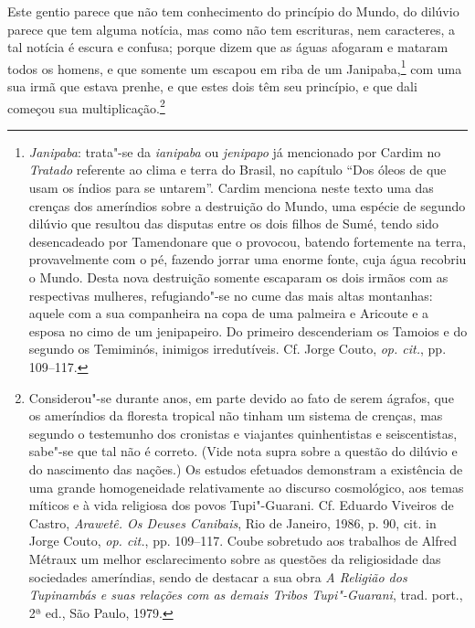 Este gentio parece que não tem conhecimento do
princípio do Mundo, do dilúvio parece que tem alguma notícia, mas como
não tem escrituras, nem caracteres, a tal notícia é escura e confusa;
porque dizem que as águas afogaram e mataram todos os homens, e que
somente um escapou em riba de um Janipaba,\footnote{ \textit{Janipaba}: 
trata"-se da \textit{ianipaba} ou \textit{jenipapo} já mencionado por
Cardim no \textit{Tratado} referente ao clima e terra do Brasil, no
capítulo ``Dos óleos de que usam os índios para se untarem''. Cardim
menciona neste texto uma das crenças dos ameríndios sobre a destruição
do Mundo, uma espécie de segundo dilúvio que resultou das disputas
entre os dois filhos de Sumé, tendo sido desencadeado por Tamendonare
que o provocou, batendo fortemente na terra, provavelmente com o pé,
fazendo jorrar uma enorme fonte, cuja água recobriu o Mundo. Desta nova
destruição somente escaparam os dois irmãos com as respectivas
mulheres, refugiando"-se no cume das mais altas montanhas: aquele com a
sua companheira na copa de uma palmeira e Aricoute e a esposa no cimo
de um jenipapeiro. Do primeiro descenderiam os Tamoios e do segundo os
Temiminós, inimigos irredutíveis. Cf. Jorge Couto, \textit{op. cit.}, pp. 109--117.} 
com uma sua irmã que estava prenhe, e que estes dois têm
seu princípio, e que dali começou sua multiplicação.\footnote{ Considerou"-se 
durante anos, em parte devido ao fato de serem ágrafos,
que os ameríndios da floresta tropical não tinham um sistema de
crenças, mas segundo o testemunho dos cronistas e viajantes
quinhentistas e seiscentistas, sabe"-se que tal não é correto. (Vide
nota supra sobre a questão do dilúvio e do nascimento das nações.) Os
estudos efetuados demonstram a existência de uma grande homogeneidade
relativamente ao discurso cosmológico, aos temas míticos e à vida
religiosa dos povos Tupi"-Guarani. Cf. Eduardo Viveiros de Castro,
\textit{Arawetê. Os Deuses Canibais}, Rio de Janeiro, 1986, p. 90, cit.
in Jorge Couto, \textit{op. cit.}, pp. 109--117. Coube sobretudo aos
trabalhos de Alfred Métraux um melhor esclarecimento sobre as questões
da religiosidade das sociedades ameríndias, sendo de destacar a sua
obra \textit{A Religião dos Tupinambás e suas relações com as demais
Tribos Tupi"-Guarani}, trad. port., 2ª ed., São Paulo, 1979.} 

